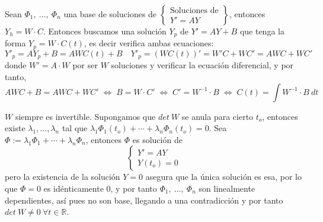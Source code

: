 Sean $\Phi_1, \: \ldots, \: \Phi_n$ una base de soluciones de {\scriptsize $\left\{\begin{array}{c}
     \text{Soluciones de}  \\
     Y'=AY
\end{array} \right\}$}, entonces $Y_h=W \cdot C$. Entonces buscamos una solución $Y_p$ de $Y'=AY+B$ que tenga la forma $Y_p=W \cdot C(t)$, es decir verifica ambas ecuaciones:
$$Y'_p=AY_p+B=AWC(t)+B \quad Y'_p=(W C(t))'=W'C+WC'=AWC+WC'$$
donde $W'=A \cdot W$ por ser $W$ soluciones y verificar la ecuación diferencial, y por tanto, 
$$AWC+B=AWC+WC' \; \iff \; B=W \cdot C' \; \iff \; C'=W^{-1} \cdot B \; \iff \; C(t)=\int W^{-1}\cdot B \: dt$$
\begin{obs}
 $W$ siempre es invertible. Supongamos que $det \: W $ se anula para cierto $t_o$, entonces existe $\lambda_1, \ldots, \lambda_n$ tal que $\lambda_1 \Phi_1(t_o)+ \cdots + \lambda_n \Phi_n(t_o)=0$. Sea $\Phi:=\lambda_1 \Phi_1+ \cdots + \lambda_n \Phi_n$, entonces $\Phi$ es solución de 
 $$\left\{ \begin{array}{l}
      Y'=AY  \\
      Y(t_o)=0 
 \end{array}\right.$$
 pero la existencia de la solución $Y=0$ asegura que la única solución es esa, por lo que $\Phi=0$ es idénticamente 0, y por tanto $\Phi_1, \: \ldots , \: \Phi_n$ son linealmente dependientes, así pues no son base, llegando a una contradicción y por tanto $det \: W \neq 0 \: \forall t \in \mathbb R$.  
\end{obs}
